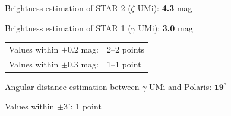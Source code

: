 Brightness estimation of STAR 2 ($\zeta$ UMi): \textbf{4.3} mag

Brightness estimation of STAR 1 ($\gamma$ UMi): \textbf{3.0} mag

\begin{center}
\begin{tabular}{ll}
Values within $\pm 0.2$ mag: & 2--2 points \\
Values within $\pm 0.3$ mag: & 1--1 point \\
\end{tabular}
\end{center}

Angular distance estimation between $\gamma$ UMi and Polaris:
$\mathbf{19^\circ}$

Values within $\pm 3^\circ$: \hfill 1 point
